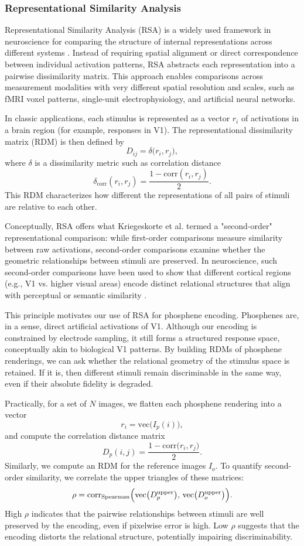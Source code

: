 \subsubsection{Representational Similarity Analysis}
Representational Similarity Analysis (RSA) is a widely used framework in neuroscience for comparing the structure of internal representations across different systems \cite{Kriegeskorte2008}. Instead of requiring spatial alignment or direct correspondence between individual activation patterns, RSA abstracts each representation into a pairwise dissimilarity matrix. This approach enables comparisons across measurement modalities with very different spatial resolution and scales, such as fMRI voxel patterns, single-unit electrophysiology, and artificial neural networks.

In classic applications, each stimulus is represented as a vector \(r_i\) of activations in a brain region (for example, responses in V1). The representational dissimilarity matrix (RDM) is then defined by
\[
D_{ij} = \delta\bigl(r_i, r_j\bigr),
\]
where \(\delta\) is a dissimilarity metric such as correlation distance
\[
\delta_{\mathrm{corr}}(r_i, r_j) = \frac{1 - \mathrm{corr}(r_i, r_j)}{2}.
\]
This RDM characterizes how different the representations of all pairs of stimuli are relative to each other. 

Conceptually, RSA offers what Kriegeskorte et al. termed a "second-order" representational comparison: while first-order comparisons measure similarity between raw activations, second-order comparisons examine whether the geometric relationships between stimuli are preserved. In neuroscience, such second-order comparisons have been used to show that different cortical regions (e.g., V1 vs. higher visual areas) encode distinct relational structures that align with perceptual or semantic similarity \cite{Wang2018}.

This principle motivates our use of RSA for phosphene encoding. Phosphenes are, in a sense, direct artificial activations of V1. Although our encoding is constrained by electrode sampling, it still forms a structured response space, conceptually akin to biological V1 patterns. By building RDMs of phosphene renderings, we can ask whether the relational geometry of the stimulus space is retained. If it is, then different stimuli remain discriminable in the same way, even if their absolute fidelity is degraded.

Practically, for a set of \(N\) images, we flatten each phosphene rendering into a vector
\[
r_i = \mathrm{vec}\bigl(I_p(i)\bigr),
\]
and compute the correlation distance matrix
\[
D_p(i,j) = \frac{1 - \mathrm{corr}\bigl(r_i, r_j\bigr)}{2}.
\]
Similarly, we compute an RDM for the reference images \(I_o\). To quantify second-order similarity, we correlate the upper triangles of these matrices:
\[
\rho = \mathrm{corr}_{\mathrm{Spearman}}\Bigl(\mathrm{vec}\bigl(D_p^{\mathrm{upper}}\bigr), \,\mathrm{vec}\bigl(D_o^{\mathrm{upper}}\bigr)\Bigr).
\]
High \(\rho\) indicates that the pairwise relationships between stimuli are well preserved by the encoding, even if pixelwise error is high. Low \(\rho\) suggests that the encoding distorts the relational structure, potentially impairing discriminability.

